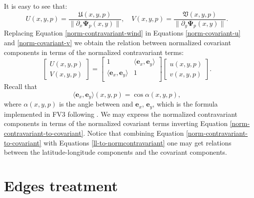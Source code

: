 It is easy to see that:
\begin{equation}
	\label{covari-uv}
	{U}(x,y,p)  = \frac{\mathfrak{U}(x,y,p)}{\|\partial_x\boldsymbol{\Psi}_p(x,y)\|}, \quad
	{V}(x,y,p)  = \frac{\mathfrak{V}(x,y,p)}{\|\partial_y\boldsymbol{\Psi}_p(x,y)\|}.
\end{equation}
Replacing Equation \eqref{norm-contravariant-wind} in 
Equations \eqref{norm-covariant-u} and \eqref{norm-covariant-v} we obtain
the relation between normalized covariant components in terms of the
normalized contravariant terms:
\begin{equation}
	\label{norm-contravariant-to-covariant}
	\begin{bmatrix}
		{U}(x,y,p) \\
		{V}(x,y,p)
	\end{bmatrix}
	=
	\begin{bmatrix}
		1 
		& \langle 	\boldsymbol{e}_x, \boldsymbol{e}_y \rangle \\
		\langle 	\boldsymbol{e}_x, \boldsymbol{e}_y \rangle 
		& 1\\
	\end{bmatrix}
	\begin{bmatrix}
		{u} (x,y,p) \\
		{v} (x,y,p) 
	\end{bmatrix}.
\end{equation}
Recall that
\begin{equation}
\langle 	\boldsymbol{e}_x, \boldsymbol{e}_y \rangle(x,y,p) = \cos \alpha(x,y,p),
\end{equation}
where $\alpha(x,y,p)$ is the angle between and 	$\boldsymbol{e}_x$, $\boldsymbol{e}_y$, which
is the formula implemented in FV3 following \citet{putman:2007}.
We may express the normalized contravariant components in terms of 
the normalized covariant terms inverting Equation \eqref{norm-contravariant-to-covariant}.
Notice that combining Equation \eqref{norm-contravariant-to-covariant} with Equations
\eqref{ll-to-normcontravariant}
one may get relations between the latitude-longitude 
components and the covariant components.


\section{Edges treatment}
\label{cs-halodata}

